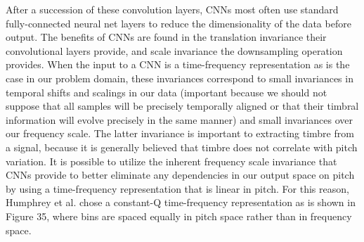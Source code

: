 \documentclass[12pt]{report} 	%
\numberwithin{figure}{chapter}
\numberwithin{table}{chapter}
\numberwithin{equation}{chapter}
\begin{document}
\begin{flushleft}
\begin{figure}[h!]
\begin{center}
\end{center}
\end{figure}
After a succession of these convolution layers, CNNs most often use standard fully-connected neural net layers to reduce the dimensionality of the data before output. The benefits of CNNs are found in the translation invariance their convolutional layers provide, and scale invariance the downsampling operation provides. When the input to a CNN is a time-frequency representation as is the case in our problem domain, these invariances correspond to small invariances in temporal shifts and scalings in our data (important because we should not suppose that all samples will be precisely temporally aligned or that their timbral information will evolve precisely in the same manner) and small invariances over our frequency scale. The latter invariance is important to extracting timbre from a signal, because it is generally believed that timbre does not correlate with pitch variation. It is possible to utilize the inherent frequency scale invariance that CNNs provide to better eliminate any dependencies in our output space on pitch by using a time-frequency representation that is linear in pitch. For this reason, Humphrey et al. chose a constant-Q time-frequency representation as is shown in Figure 35, where bins are spaced equally in pitch space rather than in frequency space.


\end{flushleft}
\end{document}
